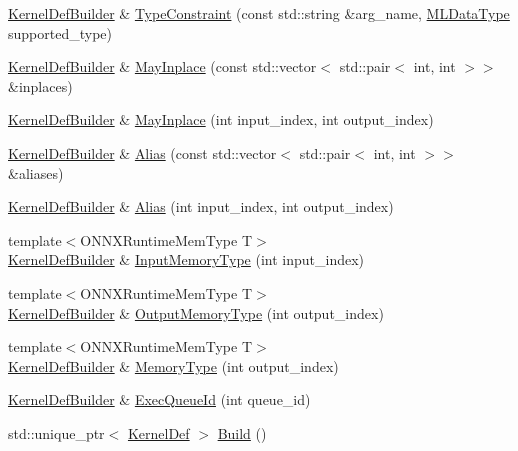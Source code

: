\begin{DoxyCompactItemize}
\item 
\mbox{\hyperlink{classonnxruntime_1_1KernelDefBuilder}{Kernel\+Def\+Builder}} \& \mbox{\hyperlink{classonnxruntime_1_1KernelDefBuilder_af70791aeb4d4368813271ad264927f0d}{Type\+Constraint}} (const std\+::string \&arg\+\_\+name, \mbox{\hyperlink{namespaceonnxruntime_ad77d0a6e838ec7da5dc35fed5ee66b49}{M\+L\+Data\+Type}} supported\+\_\+type)
\item 
\mbox{\hyperlink{classonnxruntime_1_1KernelDefBuilder}{Kernel\+Def\+Builder}} \& \mbox{\hyperlink{classonnxruntime_1_1KernelDefBuilder_a5384a86c2c9aeab28fc66522020408a6}{May\+Inplace}} (const std\+::vector$<$ std\+::pair$<$ int, int $>$$>$ \&inplaces)
\item 
\mbox{\hyperlink{classonnxruntime_1_1KernelDefBuilder}{Kernel\+Def\+Builder}} \& \mbox{\hyperlink{classonnxruntime_1_1KernelDefBuilder_adff085d96a9beac42baf91fc1ad23135}{May\+Inplace}} (int input\+\_\+index, int output\+\_\+index)
\item 
\mbox{\hyperlink{classonnxruntime_1_1KernelDefBuilder}{Kernel\+Def\+Builder}} \& \mbox{\hyperlink{classonnxruntime_1_1KernelDefBuilder_a16942b49b19a69699c44c8527fee69f4}{Alias}} (const std\+::vector$<$ std\+::pair$<$ int, int $>$$>$ \&aliases)
\item 
\mbox{\hyperlink{classonnxruntime_1_1KernelDefBuilder}{Kernel\+Def\+Builder}} \& \mbox{\hyperlink{classonnxruntime_1_1KernelDefBuilder_aabc4fe80ca7f5f0b0562ab51262a216a}{Alias}} (int input\+\_\+index, int output\+\_\+index)
\item 
{\footnotesize template$<$O\+N\+N\+X\+Runtime\+Mem\+Type T$>$ }\\\mbox{\hyperlink{classonnxruntime_1_1KernelDefBuilder}{Kernel\+Def\+Builder}} \& \mbox{\hyperlink{classonnxruntime_1_1KernelDefBuilder_a0d017e27105e5d62bedb95cd110c2819}{Input\+Memory\+Type}} (int input\+\_\+index)
\item 
{\footnotesize template$<$O\+N\+N\+X\+Runtime\+Mem\+Type T$>$ }\\\mbox{\hyperlink{classonnxruntime_1_1KernelDefBuilder}{Kernel\+Def\+Builder}} \& \mbox{\hyperlink{classonnxruntime_1_1KernelDefBuilder_a07b8f5af0f2e23ea09c3f9c0b52dc227}{Output\+Memory\+Type}} (int output\+\_\+index)
\item 
{\footnotesize template$<$O\+N\+N\+X\+Runtime\+Mem\+Type T$>$ }\\\mbox{\hyperlink{classonnxruntime_1_1KernelDefBuilder}{Kernel\+Def\+Builder}} \& \mbox{\hyperlink{classonnxruntime_1_1KernelDefBuilder_a09fef65d419d1c76521580801f8c3cb0}{Memory\+Type}} (int output\+\_\+index)
\item 
\mbox{\hyperlink{classonnxruntime_1_1KernelDefBuilder}{Kernel\+Def\+Builder}} \& \mbox{\hyperlink{classonnxruntime_1_1KernelDefBuilder_ad4b3599dd2324207a04cb9a7c729fbd3}{Exec\+Queue\+Id}} (int queue\+\_\+id)
\item 
std\+::unique\+\_\+ptr$<$ \mbox{\hyperlink{classonnxruntime_1_1KernelDef}{Kernel\+Def}} $>$ \mbox{\hyperlink{classonnxruntime_1_1KernelDefBuilder_ada0f9d0670890071573b8c09305227d5}{Build}} ()
\end{DoxyCompactItemize}


